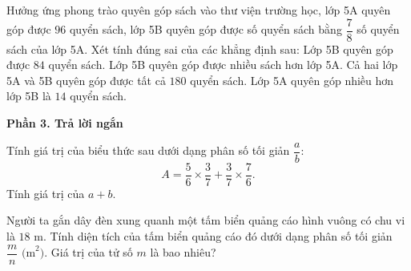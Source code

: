 \begin{ex} %
Hưởng ứng phong trào quyên góp sách vào thư viện trường học, lớp 5A quyên góp được $96$ quyển sách, lớp 5B quyên góp được số quyển sách bằng $\dfrac{7}{8}$ số quyển sách của lớp 5A. Xét tính đúng sai của các khẳng định sau:
\choiceTF
{\True Lớp 5B quyên góp được $84$ quyển sách.}
{Lớp 5B quyên góp được nhiều sách hơn lớp 5A.}
{\True Cả hai lớp 5A và 5B quyên góp được tất cả $180$ quyển sách.}
{Lớp 5A quyên góp nhiều hơn lớp 5B là $14$ quyển sách.}
\end{ex}

\textbf{Phần 3. Trả lời ngắn}

\begin{ex} %
Tính giá trị của biểu thức sau dưới dạng phân số tối giản $\dfrac{a}{b}$:
\[
A = \dfrac{5}{6} \times \dfrac{3}{7} + \dfrac{3}{7} \times \dfrac{7}{6}.
\]
Tính giá trị của $a + b$.
\end{ex}

\begin{ex} %
Người ta gắn dây đèn xung quanh một tấm biển quảng cáo hình vuông có chu vi là $18\text{ m}$. Tính diện tích của tấm biển quảng cáo đó dưới dạng phân số tối giản $\dfrac{m}{n}\text{ (m}^2\text{)}$. Giá trị của tử số $m$ là bao nhiêu?
\end{ex}

